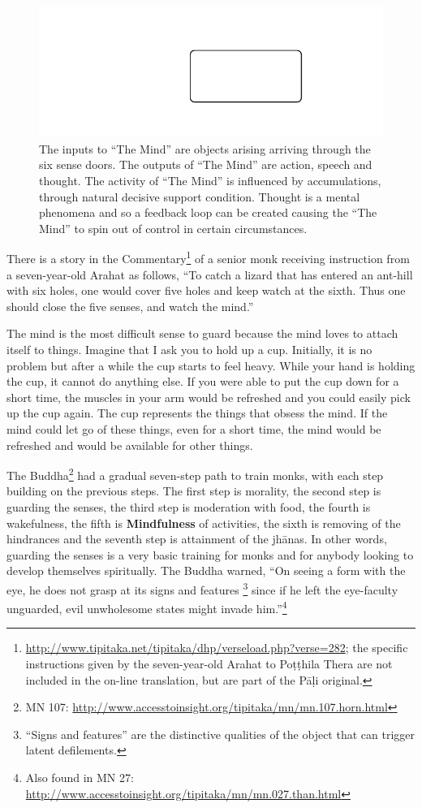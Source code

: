 \begin{figure}[h]
\centering
\includegraphics[width=0.7\linewidth]{./Diagrams/Feedback}
\caption{The inputs to “The Mind” are objects arising arriving through the six sense doors. The outputs of “The Mind” are action, speech and thought. The activity of “The Mind” is influenced by accumulations, through natural decisive support condition. Thought is a mental phenomena and so a feedback loop can be created causing the “The Mind” to spin out of control in certain circumstances.}
\label{fig:Feedback}
\end{figure}

There is a story in the Commentary\footnote{\url{http://www.tipitaka.net/tipitaka/dhp/verseload.php?verse=282}; the specific instructions given by the seven-year-old Arahat to Poṭṭhila Thera are not included in the on-line translation, but are part of the Pāḷi original.} of a senior monk receiving instruction from a seven-year-old Arahat as follows, “To catch a lizard that has entered an ant-hill with six holes, one would cover five holes and keep watch at the sixth. Thus one should close the five senses, and watch the mind.”

The mind is the most difficult sense to guard because the mind loves to attach itself to things. Imagine that I ask you to hold up a cup. Initially, it is no problem but after a while the cup starts to feel heavy. While your hand is holding the cup, it cannot do anything else. If you were able to put the cup down for a short time, the muscles in your arm would be refreshed and you could easily pick up the cup again. The cup represents the things that obsess the mind. If the mind could let go of these things, even for a short time, the mind would be refreshed and would be available for other things.

The Buddha\footnote{MN 107: \url{http://www.accesstoinsight.org/tipitaka/mn/mn.107.horn.html}} had a gradual seven-step path to train monks, with each step building on the previous steps. The first step is morality, the second step is guarding the senses, the third step is moderation with food, the fourth is wakefulness, the fifth is \textbf{Mindfulness} of activities, the sixth is removing of the hindrances and the seventh step is attainment of the jhānas. In other words, guarding the senses is a very basic training for monks and for anybody looking to develop themselves spiritually. The Buddha warned, “On seeing a form with the eye, he does not grasp at its signs and features \footnote{“Signs and features” are the distinctive qualities of the object that can trigger latent defilements.} since if he left the eye-faculty unguarded, evil unwholesome states might invade him.”\footnote{Also found in MN 27: \url{http://www.accesstoinsight.org/tipitaka/mn/mn.027.than.html}}

